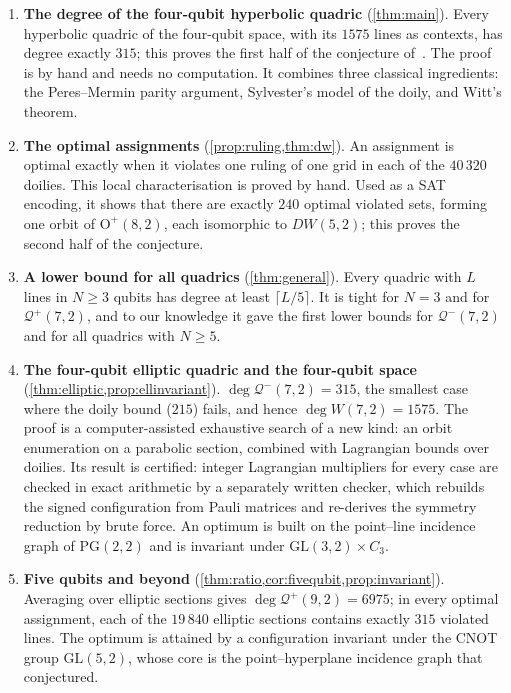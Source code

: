 \documentclass[11pt]{article}
\theoremstyle{definition}
\theoremstyle{remark}
\newcommand{\Qp}{\mathcal{Q}^{+}}
\newcommand{\Qm}{\mathcal{Q}^{-}}
\newcommand{\dg}{\operatorname{deg}}
\newcommand{\GO}{\mathrm{O}}
\begin{document}
\begin{enumerate}[label=\textbf{C\arabic*.},leftmargin=*]
\item \textbf{The degree of the four-qubit hyperbolic quadric} (\cref{thm:main}).
Every hyperbolic quadric of the four-qubit space, with its $1575$ lines as contexts, has degree exactly $315$; this proves the first half of the conjecture of~\cite{Muller24}.
The proof is by hand and needs no computation.
It combines three classical ingredients: the Peres--Mermin parity argument, Sylvester's model of the doily, and Witt's theorem.
\item \textbf{The optimal assignments} (\cref{prop:ruling,thm:dw}).
An assignment is optimal exactly when it violates one ruling of one grid in each of the $40\,320$ doilies.
This local characterisation is proved by hand.
Used as a SAT encoding, it shows that there are exactly $240$ optimal violated sets, forming one orbit of $\GO^+(8,2)$, each isomorphic to $DW(5,2)$; this proves the second half of the conjecture.
\item \textbf{A lower bound for all quadrics} (\cref{thm:general}).
Every quadric with $L$ lines in $N\ge3$ qubits has degree at least $\lceil L/5\rceil$.
It is tight for $N=3$ and for $\Qp(7,2)$, and to our knowledge it gave the first lower bounds for $\Qm(7,2)$ and for all quadrics with $N\ge5$.
\item \textbf{The four-qubit elliptic quadric and the four-qubit space} (\cref{thm:elliptic,prop:ellinvariant}).
$\dg\Qm(7,2)=315$, the smallest case where the doily bound ($215$) fails, and hence $\dg W(7,2)=1575$.
The proof is a computer-assisted exhaustive search of a new kind: an orbit enumeration on a parabolic section, combined with Lagrangian bounds over doilies.
Its result is certified: integer Lagrangian multipliers for every case are checked in exact arithmetic by a separately written checker, which rebuilds the signed configuration from Pauli matrices and re-derives the symmetry reduction by brute force.
An optimum is built on the point--line incidence graph of $\mathrm{PG}(2,2)$ and is invariant under $\mathrm{GL}(3,2)\times C_3$.
\item \textbf{Five qubits and beyond} (\cref{thm:ratio,cor:fivequbit,prop:invariant}).
Averaging over elliptic sections gives $\dg\Qp(9,2)=6975$; in every optimal assignment, each of the $19\,840$ elliptic sections contains exactly $315$ violated lines.
The optimum is attained by a configuration invariant under the CNOT group $\mathrm{GL}(5,2)$, whose core is the point--hyperplane incidence graph that~\cite{Muller24} conjectured.

\end{enumerate}
\end{document}
